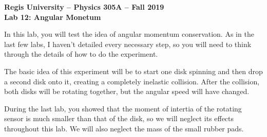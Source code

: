 \documentclass[11pt]{article}
\begin{document}
\begin{center}
{\bf{Regis University -- Physics 305A -- Fall 2019}} \\
{\bf{Lab 12: Angular Monetum}} \\
\end{center}

In this lab, you will test the idea of angular momentum conservation.
As in the last few labs, I haven't detailed every necessary step, so you will need to 
think through the details of how to do the experiment.

The basic idea of this experiment will be to start one disk spinning and then drop a second disk onto it, creating a completely inelastic collision. After the collision, both disks will be rotating together, but the angular speed will have changed.

During the last lab, you showed that the moment of intertia of the rotating sensor is much smaller than that of the disk, so we will neglect its effects throughout this lab. We will also neglect the mass of the small rubber pads.
\bigskip
\end{document}
